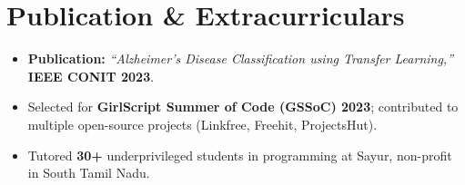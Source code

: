 \documentclass[letterpaper,10pt]{article}
\begin{document}
\section{Publication \& Extracurriculars}
\begin{itemize}[leftmargin=0.18in, itemsep=0pt, topsep=1pt]
  \item\small \textbf{Publication:} \textit{``Alzheimer's Disease Classification using Transfer Learning,''} \textbf{IEEE CONIT 2023}.
  \item\small Selected for \textbf{GirlScript Summer of Code (GSSoC) 2023}; contributed to multiple open-source projects (Linkfree, Freehit, ProjectsHut).
  \item\small Tutored \textbf{30+} underprivileged students in programming at Sayur, non-profit in South Tamil Nadu.
\end{itemize}
\vspace{-6pt}
\end{document}
